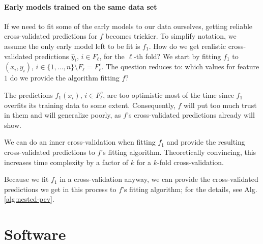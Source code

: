 \paragraph{Early models trained on the same data set}
If we need to fit some of the early models to our data ourselves, getting reliable cross-validated 
predictions
for $f$ becomes trickier. To simplify notation, we assume the only early model left to be fit is 
$f_1$. How do 
we get realistic cross-validated predictions $\hat{y}_i$, $i \in F_\ell$, for the $\ell$-th fold? 
We start by fitting $f_1$ to $(x_i, y_i)$, $i \in \{ 1, \ldots, n \} \setminus F_\ell = F_\ell^c$.
The question reduces to: which values for feature $1$ do we provide the algorithm fitting $f$?

The predictions $f_1(x_i)$, $i \in F_\ell^c$, are too optimistic most of the time since 
$f_1$ overfits its training data to some extent. Consequently, $f$ will put too much
trust in them and will generalize poorly, as $f$'s cross-validated predictions already will 
show.

We can do an inner cross-validation when fitting $f_1$ and provide the resulting 
cross-validated predictions to $f$'s fitting algorithm. Theoretically convincing, this increases 
time complexity by a factor of $k$ for a $k$-fold cross-validation.

Because we fit $f_1$ in a cross-validation anyway, we can provide the cross-validated 
predictions we get in this process to $f$'s fitting algorithm; for the details, see 
Alg. \ref{alg:nested-pcv}. 



\section{Software}